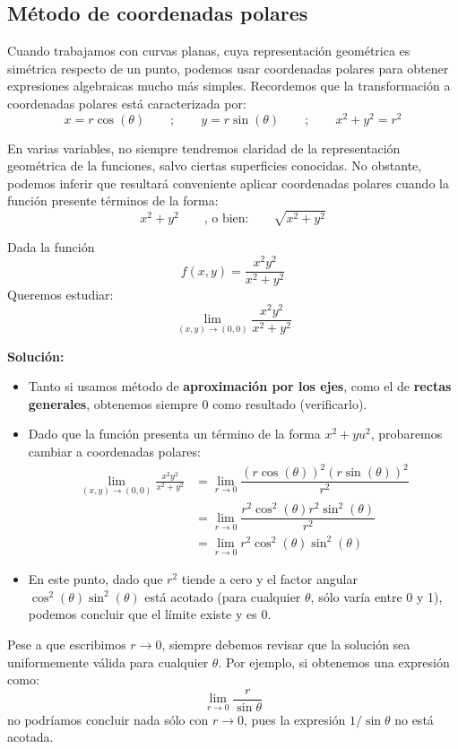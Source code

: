 \subsection{Método de coordenadas polares}

Cuando trabajamos con curvas planas, cuya representación geométrica es simétrica respecto de un punto, podemos usar coordenadas polares para obtener expresiones algebraicas mucho más simples. Recordemos que la transformación a coordenadas polares está caracterizada por:
\[
x =r \cos (\theta) \qquad ; \qquad y =r \sin (\theta) \qquad ; \qquad x^2 + y^2 = r^2
\]

En varias variables, no siempre tendremos claridad de la representación geométrica de la funciones, salvo ciertas superficies conocidas. No obstante, podemos inferir que resultará conveniente aplicar coordenadas polares cuando la función presente términos de la forma:
\[
x^2 + y^2 \qquad \text{, o bien:} \qquad \sqrt{x^2 + y^2}
\]


\begin{ejemplo}
Dada la función
\[
f(x,y)=\frac{x^2y^2}{x^2+y^2}
\]
Queremos estudiar:
\[
\lim_{(x,y)\to(0,0)}\frac{x^2y^2}{x^2+y^2}
\] 
\end{ejemplo}
\textbf{Solución:}
\begin{itemize}
    \item Tanto si usamos método de \textbf{aproximación por los ejes}, como el de \textbf{rectas generales}, obtenemos siempre 0 como resultado (verificarlo).
    \item Dado que la función presenta un término de la forma $x^2+yu^2$, probaremos cambiar a coordenadas polares:
        \begin{align*}
        \lim_{(x,y)\to(0,0)}\frac{x^2y^2}{x^2+y^2} &=\lim_{r \to 0}\dfrac{(r \cos (\theta))^2(r \sin (\theta))^2}{r^2} \\
        &=\lim_{r \to 0}\dfrac{r^2 \cos^2 (\theta) r^2 \sin^2 (\theta)}{r^2} \\
        &=\lim_{r \to 0} r^2 \cos^2 (\theta)  \sin^2 (\theta)
        \end{align*}
    \item En este punto, dado que $r^2$ tiende a cero y el factor angular $\cos^2 (\theta)  \sin^2 (\theta)$ está acotado (para cualquier $\theta$, sólo varía entre 0 y 1), podemos concluir que el límite existe y es 0.
\end{itemize}

\begin{nota}
Pese a que escribimos $r \to 0$, siempre debemos revisar que la solución sea uniformemente válida para cualquier $\theta$. Por ejemplo, si obtenemos una expresión como:
\[
\lim_{r\to 0}\frac{r}{\sin \theta}
\] 
no podríamos concluir nada sólo con $r \to 0$, pues la expresión $1/\sin \theta$ no está acotada.
\end{nota}

